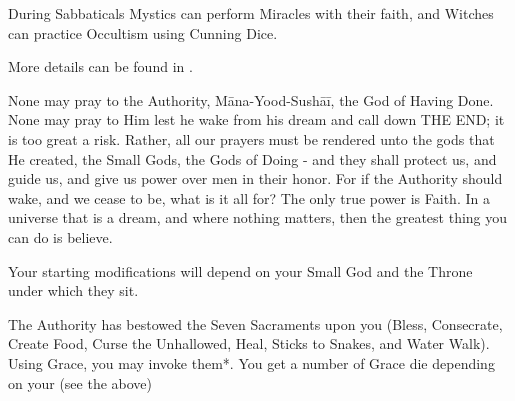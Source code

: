 {  During Sabbaticals Mystics can perform Miracles with their faith, and Witches can practice Occultism using Cunning Dice.


  More details can be found in .

  \newpage




  None may pray to the Authority, Māna-Yood-Sushāī, the God of Having Done.  None may pray to Him lest he wake from his dream and call down THE END; it is too great a risk.  Rather, all our prayers must be rendered unto  the gods that He created, the Small Gods, the Gods of Doing - and they shall protect us, and guide us, and give us power over men in their honor.  For if the Authority should wake, and we cease to be, what is it all for?  The only true power is Faith.  In a universe that is a dream, and where nothing matters, then the greatest thing you can do is believe.


  Your starting modifications will depend on your Small God and the Throne under which they sit.


  
  The Authority has bestowed the Seven Sacraments upon you (Bless, Consecrate, Create Food, Curse the Unhallowed, Heal, Sticks to Snakes, and Water Walk). Using Grace, you may invoke them*.  You get a number of Grace die depending on your \LVL (see the  above)
  
}
